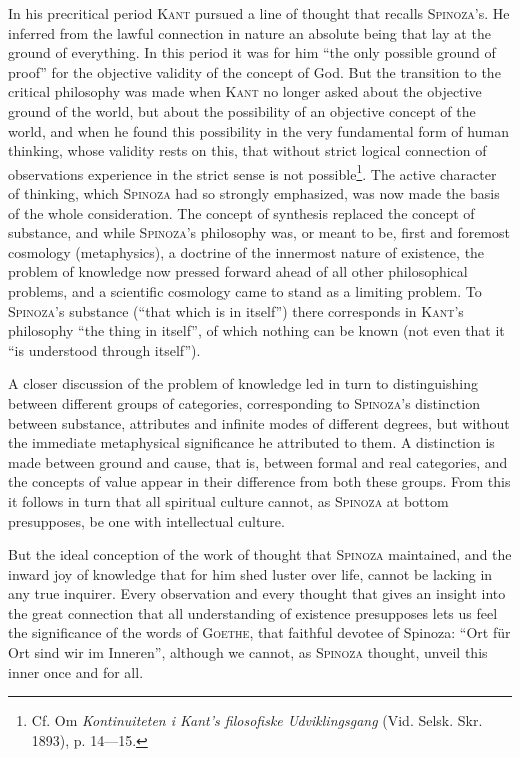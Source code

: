 \documentclass[12pt]{article}
\newcommand{\opage}[1]{\marginnote{\footnotesize\textit{[#1]}}}
\begin{document}
In his precritical period \textsc{Kant} pursued a line of thought that recalls \textsc{Spinoza}'s.
He inferred from the lawful connection in nature an absolute \opage{97}being that lay at the ground
of everything. In this period it was for him ``the only possible ground of proof'' for the
objective validity of the concept of God. But the transition to the critical philosophy was made
when \textsc{Kant} no longer asked about the objective ground of the world, but about the
possibility of an objective concept of the world, and when he found this possibility in the very
fundamental form of human thinking, whose validity rests on this, that without strict logical
connection of observations experience in the strict sense is not possible\footnote{Cf. Om
\textit{Kontinuiteten i Kant's filosofiske Udviklingsgang} (Vid. Selsk. Skr. 1893), p. 14---15.}.
The active character of thinking, which \textsc{Spinoza} had so strongly emphasized, was now made
the basis of the whole consideration. The concept of synthesis replaced the concept of substance,
and while \textsc{Spinoza}'s philosophy was, or meant to be, first and foremost cosmology
(metaphysics), a doctrine of the innermost nature of existence, the problem of knowledge now pressed
forward ahead of all other philosophical problems, and a scientific cosmology came to stand as a
limiting problem. To \textsc{Spinoza}'s substance (``that which is in itself'') there corresponds
in \textsc{Kant}'s philosophy ``the thing in itself'', of which nothing can be known (not even that
it ``is understood through itself'').

A closer discussion of the problem of knowledge led in turn to distinguishing between different
groups of categories, corresponding to \textsc{Spinoza}'s distinction between substance, attributes
and infinite modes of different degrees, but without the immediate metaphysical significance he %
attributed to them. A distinction is made between ground and cause, that is, between formal and
real categories, and the concepts of value appear in their difference from both these groups. From
this it follows in turn that all spiritual culture cannot, as \textsc{Spinoza} at bottom
presupposes, be one with intellectual culture.

But the ideal conception of the work of thought that \textsc{Spinoza} maintained, and the inward joy
of knowledge that for him shed luster over life, cannot be lacking in any true inquirer. Every %
observation and every thought that gives an insight into the great connection that all
understanding of existence presupposes lets us feel the significance of the words of
\textsc{Goethe}, that faithful devotee of Spinoza: ``Ort für Ort sind wir im Inneren'', although we
cannot, as \textsc{Spinoza} thought, unveil this inner once and for all.
\end{document}
